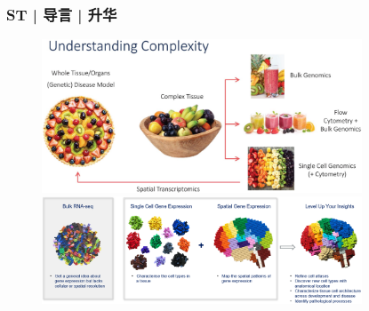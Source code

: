 \documentclass[11pt]{ctexbeamer}
\begin{document}
\begin{frame}
	\frametitle{ST | 导言 | 升华}
	\begin{figure}
		\includegraphics[width=0.85\textwidth]{ST_vs_scRNA_05.png}\\
		\vspace{0.3em}
		\includegraphics[width=0.85\textwidth]{ST_vs_scRNA_08.png}
	\end{figure}
\end{frame}
\end{document}
